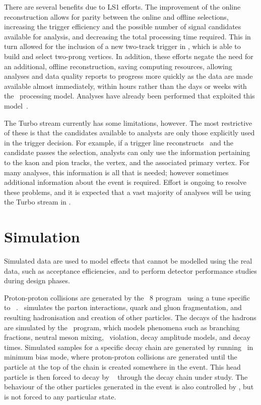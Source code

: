 There are several benefits due to \ac{LS1} efforts.
The improvement of the online reconstruction allows for parity between the 
online and offline selections, increasing the trigger efficiency and the 
possible number of signal candidates available for analysis, and decreasing the 
total processing time required.
This in turn allowed for the inclusion of a new two-track trigger in \hltone, 
which is able to build and select two-prong vertices.
In addition, these efforts negate the need for an additional, offline 
reconstruction, saving computing resources,
 allowing analyses and data quality reports to progress more quickly as the 
 data are made available almost immediately, within hours rather than the days 
 or weeks with the \runone\ processing model.
 Analyses have already been performed that exploited this 
 model~\cite{LHCb-PAPER-2015-037,Aaij:2015bpa,Aaij:2016jht}.

 The Turbo stream currently has some limitations, however.
 The most restrictive of these is that the candidates available to analysts are 
 only those explicitly used in the trigger decision.
 For example, if a trigger line reconstructs \DzToKpi\ and the candidate passes 
 the selection, analysts can only use the information pertaining to the kaon 
 and pion tracks, the \PDzero vertex, and the associated primary vertex.
 For many analyses, this information is all that is needed; however sometimes 
 additional information about the event is required.
 Effort is ongoing to resolve these problems, and it is expected that a vast 
 majority of analyses will be using the Turbo stream in \runthree.

\section{Simulation}
\label{chap:intro:lhcb:simulation}

Simulated data are used to model effects that cannot be modelled using the real 
data, such as acceptance efficiencies, and to perform detector performance 
studies during design phases.

Proton-proton collisions are generated by the \pythia\ 8 
program~\cite{Sjostrand:2007gs} using a tune specific to 
\lhcb~\cite{Belyaev:1322400}.
\pythia\ simulates the parton interactions, quark and gluon fragmentation, and 
resulting hadronisation and creation of other particles.
The decays of the hadrons are simulated by the \evtgen\ program, which models 
phenomena such as branching fractions, neutral meson mixing, \CP\ violation, 
decay amplitude models, and decay times.
Simulated samples for a specific decay chain are generated by running \pythia\ 
in minimum bias mode, where proton-proton collisions are generated until the 
particle at the top of the chain is created somewhere in the event.
This head particle is then forced to decay by \evtgen~\cite{Clemencic:2011zza} 
through the decay chain under study.
The behaviour of the other particles generated in the event is also controlled 
by \evtgen, but is not forced to any particular state.

